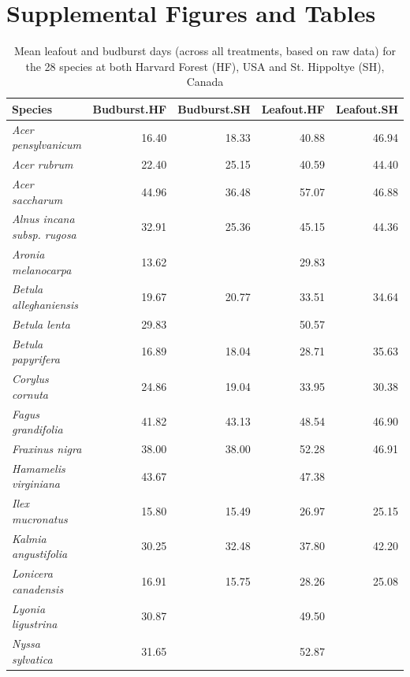 \documentclass{article}
\begin{document}



\newpage
\section*{Supplemental Figures and Tables}

\begin{table}[ht]
\centering
\caption{Mean leafout and budburst days (across all treatments, based on raw data) for the 28 species at both Harvard Forest (HF), USA and St. Hippoltye (SH), Canada} 
\begin{tabular}{lrrrr}
  \hline
Species & Budburst.HF & Budburst.SH & Leafout.HF & Leafout.SH \\ 
  \hline
\textit{Acer pensylvanicum} & 16.40 & 18.33 & 40.88 & 46.94 \\ 
  \textit{Acer rubrum} & 22.40 & 25.15 & 40.59 & 44.40 \\ 
  \textit{Acer saccharum} & 44.96 & 36.48 & 57.07 & 46.88 \\ 
  \textit{Alnus incana subsp. rugosa} & 32.91 & 25.36 & 45.15 & 44.36 \\ 
  \textit{Aronia melanocarpa} & 13.62 &  & 29.83 &  \\ 
  \textit{Betula alleghaniensis} & 19.67 & 20.77 & 33.51 & 34.64 \\ 
  \textit{Betula lenta} & 29.83 &  & 50.57 &  \\ 
  \textit{Betula papyrifera} & 16.89 & 18.04 & 28.71 & 35.63 \\ 
  \textit{Corylus cornuta} & 24.86 & 19.04 & 33.95 & 30.38 \\ 
  \textit{Fagus grandifolia} & 41.82 & 43.13 & 48.54 & 46.90 \\ 
  \textit{Fraxinus nigra} & 38.00 & 38.00 & 52.28 & 46.91 \\ 
  \textit{Hamamelis virginiana} & 43.67 &  & 47.38 &  \\ 
  \textit{Ilex mucronatus} & 15.80 & 15.49 & 26.97 & 25.15 \\ 
  \textit{Kalmia angustifolia} & 30.25 & 32.48 & 37.80 & 42.20 \\ 
  \textit{Lonicera canadensis} & 16.91 & 15.75 & 28.26 & 25.08 \\ 
  \textit{Lyonia ligustrina} & 30.87 &  & 49.50 &  \\ 
  \textit{Nyssa sylvatica} & 31.65 &  & 52.87 &  \\ 

\end{tabular}
\end{table}
\end{document}
